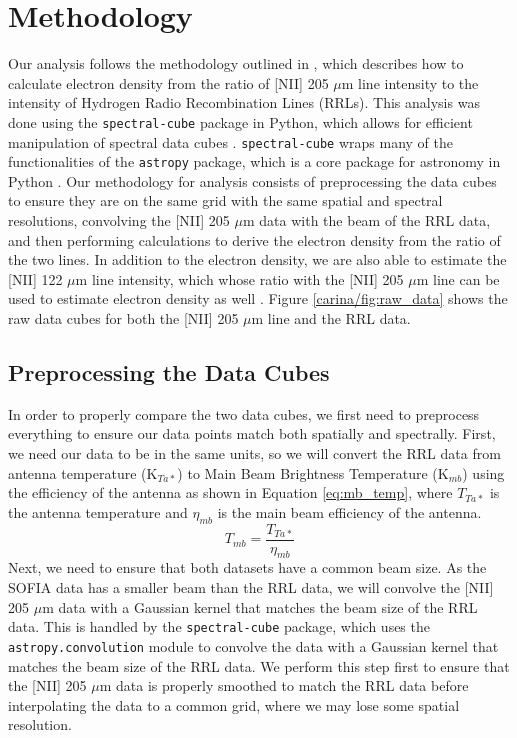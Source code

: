 \section{Methodology}
Our analysis follows the methodology outlined in \cite{pineda2019electron}, which describes how to calculate electron density from the ratio of [NII] 205 $\mu$m line intensity to the intensity of Hydrogen Radio Recombination Lines (RRLs).
This analysis was done using the \texttt{spectral-cube} package in Python, which allows for efficient manipulation of spectral data cubes \parencite{robitaille2016spectral}.
\texttt{spectral-cube} wraps many of the functionalities of the \texttt{astropy} package, which is a core package for astronomy in Python \parencite{astropy:2013, astropy:2018, astropy:2022}.
Our methodology for analysis consists of preprocessing the data cubes to ensure they are on the same grid with the same spatial and spectral resolutions, convolving the [NII] 205 $\mu$m data with the beam of the RRL data, and then performing calculations to derive the electron density from the ratio of the two lines.
In addition to the electron density, we are also able to estimate the [NII] 122 $\mu$m line intensity, which whose ratio with the [NII] 205 $\mu$m line can be used to estimate electron density as well \parencite{goldsmith2015herschel}.
Figure \ref{carina/fig:raw_data} shows the raw data cubes for both the [NII] 205 $\mu$m line and the RRL data.

\subsection{Preprocessing the Data Cubes}
In order to properly compare the two data cubes, we first need to preprocess everything to ensure our data points match both spatially and spectrally.
First, we need our data to be in the same units, so we will convert the RRL data from antenna temperature (K$_{Ta*}$) to Main Beam Brightness Temperature (K$_{mb}$) using the efficiency of the antenna as shown in Equation \ref{eq:mb_temp}, where $T_{Ta*}$ is the antenna temperature and $\eta_{mb}$ is the main beam efficiency of the antenna.
\begin{equation}
    T_{mb} = \frac{T_{Ta*}}{\eta_{mb}}
    \label{eq:mb_temp}
\end{equation}
Next, we need to ensure that both datasets have a common beam size.
As the SOFIA data has a smaller beam than the RRL data, we will convolve the [NII] 205 $\mu$m data with a Gaussian kernel that matches the beam size of the RRL data.
This is handled by the \texttt{spectral-cube} package, which uses the \texttt{astropy.convolution} module to convolve the data with a Gaussian kernel that matches the beam size of the RRL data.
We perform this step first to ensure that the [NII] 205 $\mu$m data is properly smoothed to match the RRL data before interpolating the data to a common grid, where we may lose some spatial resolution. 

